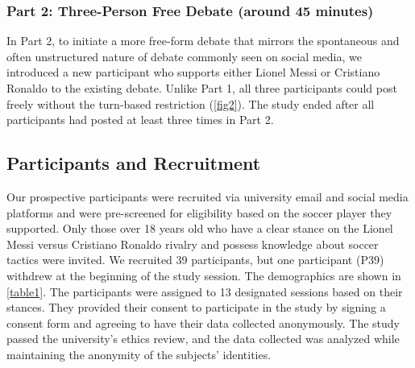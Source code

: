 \subsubsection{Part 2: Three-Person Free Debate (around 45 minutes)}

In Part 2, to initiate a more free-form debate that mirrors the spontaneous and often unstructured nature of debate commonly seen on social media, we introduced a new participant who supports either Lionel Messi or Cristiano Ronaldo to the existing debate. Unlike Part 1, all three participants could post freely without the turn-based restriction (\autoref{fig2}). The study ended after all participants had posted at least three times in Part 2.

\subsection{Participants and Recruitment}

Our prospective participants were recruited via university email and social media platforms and were pre-screened for eligibility based on the soccer player they supported. Only those over 18 years old who have a clear stance on the Lionel Messi versus Cristiano Ronaldo rivalry and possess knowledge about soccer tactics were invited. We recruited 39 participants, but one participant (P39) withdrew at the beginning of the study session. The demographics are shown in \autoref{table1}. The participants were assigned to 13 designated sessions based on their stances. They provided their consent to participate in the study by signing a consent form and agreeing to have their data collected anonymously. The study passed the university's ethics review, and the data collected was analyzed while maintaining the anonymity of the subjects' identities.

